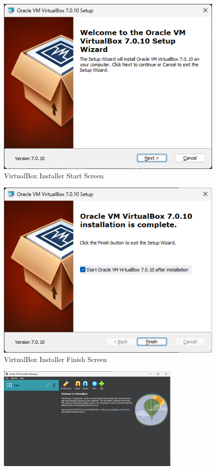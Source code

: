 \documentclass[12pt]{article}
\newenvironment{problem}[2][Problem]{\begin{trivlist}
\item[\hskip \labelsep {\bfseries #1}\hskip \labelsep {\bfseries #2.}]}{\end{trivlist}}
\begin{document}
\begin{problem}{1}
    \begin{figure}[H]
        \centering
        \includegraphics[]{install1}
        \caption{VirtualBox Installer Start Screen}
    \end{figure}
    \begin{figure}[H]
        \centering
        \includegraphics[]{install2}
        \caption{VirtualBox Installer Finish Screen}
    \end{figure}
    \begin{figure}[H]
        \centering
        \includegraphics[width=0.8\textwidth]{manager1}

\end{figure}
\end{problem}
\end{document}
